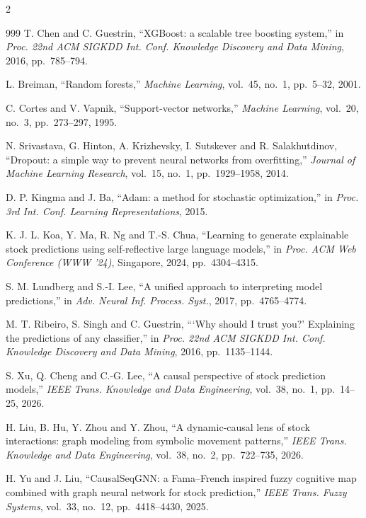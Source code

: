 \begin{footnotesize}
\begin{multicols}{2}
\begin{thebibliography}{999}
 T. Chen and C. Guestrin, ``XGBoost: a scalable tree boosting
system,'' in \emph{Proc. 22nd ACM SIGKDD Int. Conf. Knowledge Discovery and Data Mining},
2016, pp.~785--794.

 L. Breiman, ``Random forests,'' \emph{Machine Learning}, vol.~45,
no.~1, pp.~5--32, 2001.

 C. Cortes and V. Vapnik, ``Support-vector networks,'' \emph{Machine
Learning}, vol.~20, no.~3, pp.~273--297, 1995.

 N. Srivastava, G. Hinton, A. Krizhevsky, I. Sutskever and
R. Salakhutdinov, ``Dropout: a simple way to prevent neural networks from overfitting,''
\emph{Journal of Machine Learning Research}, vol.~15, no.~1, pp.~1929--1958, 2014.

 D. P. Kingma and J. Ba, ``Adam: a method for stochastic
optimization,'' in \emph{Proc. 3rd Int. Conf. Learning Representations}, 2015.

 K. J. L. Koa, Y. Ma, R. Ng and T.-S. Chua, ``Learning to generate
explainable stock predictions using self-reflective large language models,'' in \emph{Proc.
ACM Web Conference (WWW '24)}, Singapore, 2024, pp.~4304--4315.

 S. M. Lundberg and S.-I. Lee, ``A unified approach to interpreting
model predictions,'' in \emph{Adv. Neural Inf. Process. Syst.}, 2017, pp.~4765--4774.

 M. T. Ribeiro, S. Singh and C. Guestrin, ```Why should I trust you?'
Explaining the predictions of any classifier,'' in \emph{Proc. 22nd ACM SIGKDD Int. Conf.
Knowledge Discovery and Data Mining}, 2016, pp.~1135--1144.

 S. Xu, Q. Cheng and C.-G. Lee, ``A causal perspective of stock
prediction models,'' \emph{IEEE Trans. Knowledge and Data Engineering}, vol.~38, no.~1,
pp.~14--25, 2026.

 H. Liu, B. Hu, Y. Zhou and Y. Zhou, ``A dynamic-causal lens of stock
interactions: graph modeling from symbolic movement patterns,'' \emph{IEEE Trans. Knowledge
and Data Engineering}, vol.~38, no.~2, pp.~722--735, 2026.

 H. Yu and J. Liu, ``CausalSeqGNN: a Fama--French inspired fuzzy
cognitive map combined with graph neural network for stock prediction,'' \emph{IEEE Trans.
Fuzzy Systems}, vol.~33, no.~12, pp.~4418--4430, 2025.


\end{thebibliography}
\end{multicols}
\end{footnotesize}
